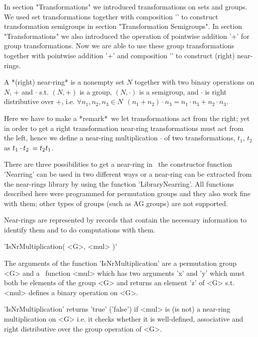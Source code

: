    
In section "Transformations" we introduced transformations on sets and groups. 
We used set transformations together with composition '\*' to construct
transformation semigroups in section "Transformation Semigroups".
In section "Transformations"
we also introduced the operation of pointwise addition '+' for group
transformations. Now we are able to use these group transformations
together with pointwise addition '+' and composition '\*' to
construct (right) near-rings.

A *(right) near-ring* is a nonempty set $N$ together with two binary 
operations on $N$, $+$ and $\cdot$ s.t. $(N,+)$ is a group, $(N,\cdot)$ is 
a semigroup, and $\cdot$ is right distributive over $+$, i.e. 
$\forall n_1,n_2,n_3 \in N\:\ (n_1+n_2)\cdot n_3 = n_1\cdot n_3+n_2\cdot n_3$.

Here we have to make a *remark*\:\ we let transformations act from the
right; yet in order to get a right transformation near-ring transformations
must act from the left, hence we define a near-ring multiplication
$\cdot$ of two transformations, $t_1$, $t_2$ as $t_1 \cdot t_2 \:=
t_2 \* t_1$.

There are three possibilities to get a near-ring in \GAP\:\ the
constructor function 'Nearring' can be used in two different ways or a 
near-ring can be extracted from the near-rings library by using the function 
'LibraryNearring'. All functions described here were programmed for
permutation groups and they also work fine with them; other types of groups
(such as AG groups) are not supported.

Near-rings are represented by records that contain the necessary information
to identify them and to do computations with them. 

   
'IsNrMultiplication( <G>, <mul> )'  

The arguments of the function 'Is\-Nr\-Mul\-ti\-pli\-ca\-tion' are a 
permutation group <G> and a \GAP\ function <mul> which has two 
arguments 'x' and 'y' which must both be elements of the group 
<G> and returns an element 'z' of <G> s.t. <mul> defines a 
binary operation on <G>.

'IsNrMultiplication' returns 'true' ('false') if <mul> is 
(is not) a near-ring multiplication on <G> i.e. it checks whether it is 
well-defined, associative and right distributive over the group operation of 
<G>.

